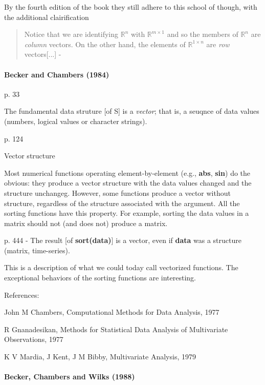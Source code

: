 
By the fourth edition of the book they still adhere to this school of though,
with the additional clairification
%
\begin{quote}
Notice that we are identifying $\mathbb R^n$ with $\mathbb R^{m\times1}$ and so the members of $\mathbb R^n$ are
\textit{column} vectors. On the other hand, the elements of $\mathbb R^{1\times n}$ are \textit{row} vectors[...]
- \cite[p. 3]{Golub2013}
\end{quote}
%

\paragraph{Becker and Chambers (1984)~\cite{Becker1984}}

p. 33

The fundamental data struture [of S] is a \textit{vector}; that is, a seuqnce of data values (numbers, logical values or character strings).

p. 124

Vector structure

Most numerical functions operating element-by-element (e.g., \textbf{abs}, \textbf{sin}) do the obvious: they produce a vector structure with the data values changed and the structure unchangeg. However, some functions produce a vector without structure, regardless of the structure associated with the argument. All the sorting functions have this property. For example, sorting the data values in a matrix should not (and does not) produce a matrix.

p. 444 - The result [of \textbf{sort(data)}] is a vector, even if \textbf{data} was a structure (matrix, time-series).

This is a description of what we could today call vectorized functions. The exceptional behaviors of the sorting functions are interesting.

References:

John M Chambers, Computational Methods for Data Analysis, 1977

R Gnanadesikan, Methods for Statistical Data Analysis of Multivariate Observations, 1977

K V Mardia, J Kent, J M Bibby, Multivariate Analysis, 1979

\paragraph{Becker, Chambers and Wilks (1988)~\cite{Becker1988}}

